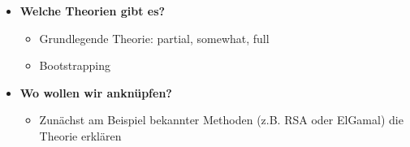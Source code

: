 \label{sec:praxis}
\begin{itemize}
    \item \textbf{Welche Theorien gibt es?}
    \begin{itemize}
        \item Grundlegende Theorie: partial, somewhat, full
        \item Bootstrapping
    \end{itemize}

    \item \textbf{Wo wollen wir anknüpfen?}
    \begin{itemize}
        \item Zunächst am Beispiel bekannter Methoden (z.B. RSA oder ElGamal) die Theorie erklären
    \end{itemize}
\end{itemize}